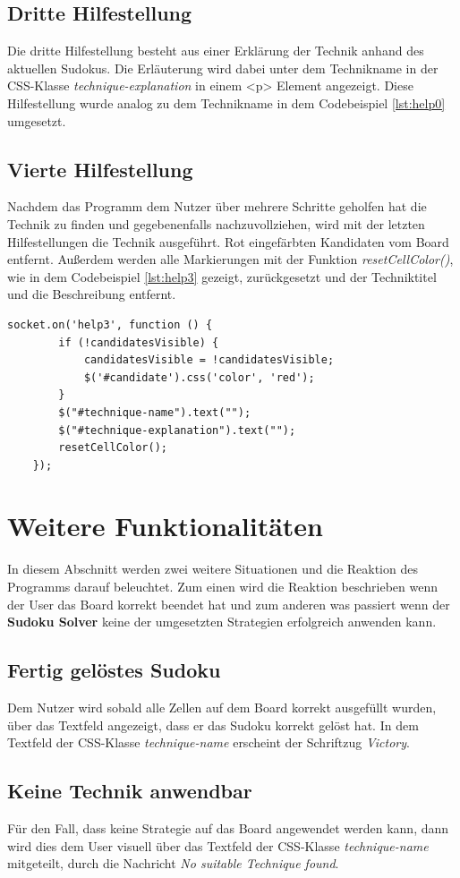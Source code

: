 \subsection{Dritte Hilfestellung}
Die dritte Hilfestellung besteht aus einer Erklärung der Technik anhand des aktuellen Sudokus. Die Erläuterung wird dabei unter dem Technikname in der CSS-Klasse \textit{technique-explanation} in einem <p> Element angezeigt. Diese Hilfestellung wurde analog zu dem Technikname in dem Codebeispiel \ref{lst:help0} umgesetzt.

\subsection{Vierte Hilfestellung}
Nachdem das Programm dem Nutzer über mehrere Schritte geholfen hat die Technik zu finden und gegebenenfalls nachzuvollziehen, wird mit der letzten Hilfestellungen die Technik ausgeführt. Rot eingefärbten Kandidaten vom Board entfernt. Außerdem werden alle Markierungen mit der Funktion \textit{resetCellColor()}, wie in dem Codebeispiel \ref{lst:help3} gezeigt, zurückgesetzt und der Techniktitel und die Beschreibung entfernt. 

\begin{lstlisting}[caption={Vierte Hilfestellung}, label={lst:help3}]
	socket.on('help3', function () {
		if (!candidatesVisible) {
			candidatesVisible = !candidatesVisible;
			$('#candidate').css('color', 'red');
		}
		$("#technique-name").text("");
		$("#technique-explanation").text("");
		resetCellColor();
	});

\end{lstlisting}

\section{Weitere Funktionalitäten}
In diesem Abschnitt werden zwei weitere Situationen und die Reaktion des Programms darauf beleuchtet. Zum einen wird die Reaktion beschrieben wenn der User das Board korrekt beendet hat und zum anderen was passiert wenn der \textbf{Sudoku Solver} keine der umgesetzten Strategien erfolgreich anwenden kann.

\subsection{Fertig gelöstes Sudoku}
Dem Nutzer wird sobald alle Zellen auf dem Board korrekt ausgefüllt wurden, über das Textfeld angezeigt, dass er das Sudoku korrekt gelöst hat. In dem Textfeld der CSS-Klasse \textit{technique-name} erscheint der Schriftzug \textit{Victory}.

\subsection{Keine Technik anwendbar}
Für den Fall, dass keine Strategie auf das Board angewendet werden kann, dann wird dies dem User visuell über das Textfeld der CSS-Klasse \textit{technique-name} mitgeteilt, durch die Nachricht \textit{No suitable Technique found}. 
